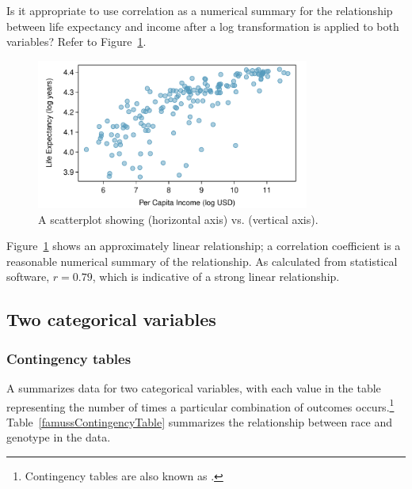 \begin{example}{Is it appropriate to use correlation as a numerical summary for the relationship between life expectancy and income after a log transformation is applied to both variables? Refer to Figure~\ref{incomeLifeExpectancyLog}.
		
		\begin{figure}[h]
			\centering
			\includegraphics[width=0.8\textwidth]
			{ch_intro_to_data_oi_biostat/figures/wdiIncomeLifeExpectancyLog/wdiIncomeLifeExpectancyLog.pdf}
			\caption{A scatterplot showing  (horizontal axis) vs.   (vertical axis).} 
			\label{incomeLifeExpectancyLog}
		\end{figure}
		
		}
	
Figure~\ref{incomeLifeExpectancyLog} shows an approximately linear relationship; a correlation coefficient is a reasonable numerical summary of the relationship. As calculated from statistical software, $r = 0.79$, which is indicative of a strong linear relationship.

\end{example}	

\subsection{Two categorical variables}

\subsubsection{Contingency tables}

A  summarizes data for two categorical variables, with each value in the table representing the number of times a particular combination of outcomes occurs.\footnote{Contingency tables are also known as .} Table~\ref{famussContingencyTable} summarizes the relationship between race and genotype in the  data.

